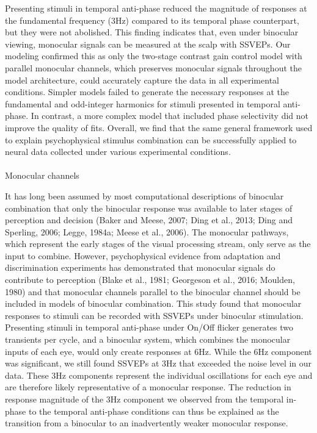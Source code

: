 \documentclass[review,
  12pt,
]{elsarticle}
\makeatletter
\let\oldparagraph\paragraph
\renewcommand{\paragraph}{
    \@ifstar
      \xxxParagraphStar
      \xxxParagraphNoStar
  }
\newcommand{\xxxParagraphStar}[1]{\oldparagraph*{#1}\mbox{}}
\newcommand{\xxxParagraphNoStar}[1]{\oldparagraph{#1}\mbox{}}
\makeatother
\begin{document}
Presenting stimuli in temporal anti-phase reduced the magnitude of
responses at the fundamental frequency (3Hz) compared to its temporal
phase counterpart, but they were not abolished. This finding indicates
that, even under binocular viewing, monocular signals can be measured at
the scalp with SSVEPs. Our modeling confirmed this as only the two-stage
contrast gain control model with parallel monocular channels, which
preserves monocular signals throughout the model architecture, could
accurately capture the data in all experimental conditions. Simpler
models failed to generate the necessary responses at the fundamental and
odd-integer harmonics for stimuli presented in temporal anti-phase. In
contrast, a more complex model that included phase selectivity did not
improve the quality of fits. Overall, we find that the same general
framework used to explain psychophysical stimulus combination can be
successfully applied to neural data collected under various experimental
conditions.

\paragraph{Monocular channels}\label{monocular-channels}

It has long been assumed by most computational descriptions of binocular
combination that only the binocular response was available to later
stages of perception and decision (Baker and Meese, 2007; Ding et al.,
2013; Ding and Sperling, 2006; Legge, 1984a; Meese et al., 2006). The
monocular pathways, which represent the early stages of the visual
processing stream, only serve as the input to combine. However,
psychophysical evidence from adaptation and discrimination experiments
has demonstrated that monocular signals do contribute to perception
(Blake et al., 1981; Georgeson et al., 2016; Moulden, 1980) and that
monocular channels parallel to the binocular channel should be included
in models of binocular combination. This study found that monocular
responses to stimuli can be recorded with SSVEPs under binocular
stimulation. Presenting stimuli in temporal anti-phase under On/Off
flicker generates two transients per cycle, and a binocular system,
which combines the monocular inputs of each eye, would only create
responses at 6Hz. While the 6Hz component was significant, we still
found SSVEPs at 3Hz that exceeded the noise level in our data. These 3Hz
components represent the individual oscillations for each eye and are
therefore likely representative of a monocular response. The reduction
in response magnitude of the 3Hz component we observed from the temporal
in-phase to the temporal anti-phase conditions can thus be explained as
the transition from a binocular to an inadvertently weaker monocular
response.
\end{document}
